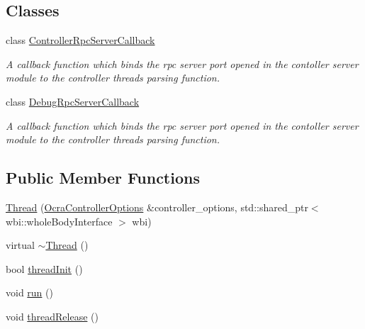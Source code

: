 \subsection*{Classes}
\begin{DoxyCompactItemize}
\item 
class \hyperlink{classThread_1_1ControllerRpcServerCallback}{Controller\+Rpc\+Server\+Callback}
\begin{DoxyCompactList}\small\item\em A callback function which binds the rpc server port opened in the contoller server module to the controller thread\textquotesingle{}s parsing function. \end{DoxyCompactList}\item 
class \hyperlink{classThread_1_1DebugRpcServerCallback}{Debug\+Rpc\+Server\+Callback}
\begin{DoxyCompactList}\small\item\em A callback function which binds the rpc server port opened in the contoller server module to the controller thread\textquotesingle{}s parsing function. \end{DoxyCompactList}\end{DoxyCompactItemize}
\subsection*{Public Member Functions}
\begin{DoxyCompactItemize}
\item 
\hyperlink{classThread_a7494a3cf676527432ee724d59ed9ee8f}{Thread} (\hyperlink{classOcraControllerOptions}{Ocra\+Controller\+Options} \&controller\+\_\+options, std\+::shared\+\_\+ptr$<$ wbi\+::whole\+Body\+Interface $>$ wbi)
\item 
virtual \hyperlink{classThread_a37d9edd3a1a776cbc27dedff949c9726}{$\sim$\+Thread} ()
\item 
bool \hyperlink{classThread_a1e840470cd71d7bfb2430d24169e3dce}{thread\+Init} ()
\item 
void \hyperlink{classThread_ad9373d8d725c46717dfce3130018fe3a}{run} ()
\item 
void \hyperlink{classThread_aa2856c7d45670f45d66bcb319255defe}{thread\+Release} ()
\end{DoxyCompactItemize}
